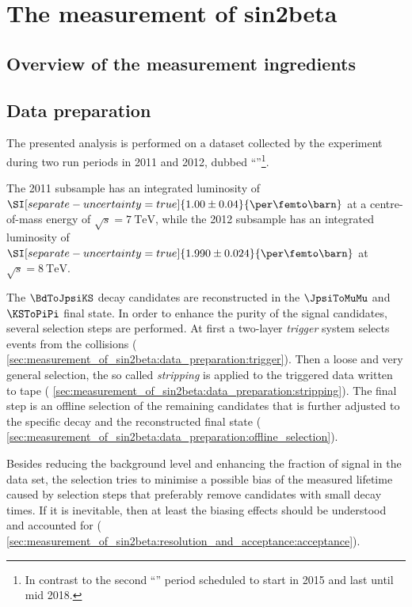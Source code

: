 
\chapter{The measurement of sin2beta}
\label{ch:measurement_of_sin2beta}

\section{Overview of the measurement ingredients}
\label{sec:measurement_of_sin2beta:overview}

\section{Data preparation}
\label{sec:measurement_of_sin2beta:data_preparation}

The presented analysis is performed on a dataset collected by the \LHCb
experiment during two run periods in 2011 and 2012, dubbed
\enquote{\RunOne}\footnote{In contrast to the second \enquote{\RunTwo} period
scheduled to start in 2015 and last until mid 2018.}.

The 2011 subsample has an integrated luminosity of
$\SI[separate-uncertainty=true]{1.00\pm0.04}{\per\femto\barn}$ at a
centre-of-mass energy of $\sqrt{s}=\SI{7}{\TeV}$, while the 2012 subsample has
an integrated luminosity of
$\SI[separate-uncertainty=true]{1.990\pm0.024}{\per\femto\barn}$ at
$\sqrt{s}=\SI{8}{\TeV}$.

The $\BdToJpsiKS$ decay candidates are reconstructed in the $\JpsiToMuMu$ and
$\KSToPiPi$ final state. In order to enhance the purity of the signal
candidates, several selection steps are performed. At first a two-layer
\emph{trigger} system selects events from the \protonproton collisions (\cf
\cref{sec:measurement_of_sin2beta:data_preparation:trigger}). Then a loose and very general
selection, the so called \emph{stripping} is applied to the triggered data
written to tape (\cf
\cref{sec:measurement_of_sin2beta:data_preparation:stripping}). The final step
is an offline selection of the remaining candidates that is further adjusted to
the specific decay and the reconstructed final state (\cf
\cref{sec:measurement_of_sin2beta:data_preparation:offline_selection}).

Besides reducing the background level and enhancing the fraction of signal in
the data set, the selection tries to minimise a possible bias of the measured
\Bd lifetime caused by selection steps that preferably remove candidates with
small decay times. If it is inevitable, then at least the biasing effects should
be understood and accounted for (\cf
\cref{sec:measurement_of_sin2beta:resolution_and_acceptance:acceptance}).

